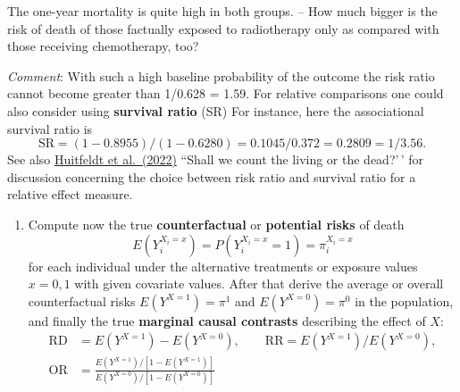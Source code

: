 \documentclass[
]{book}
\newenvironment{Shaded}{\begin{snugshade}}{\end{snugshade}}
\newcommand{\AttributeTok}[1]{\textcolor[rgb]{0.13,0.29,0.53}{#1}}
\newcommand{\DecValTok}[1]{\textcolor[rgb]{0.00,0.00,0.81}{#1}}
\newcommand{\FunctionTok}[1]{\textcolor[rgb]{0.13,0.29,0.53}{\textbf{#1}}}
\newcommand{\NormalTok}[1]{#1}
\newcommand{\OtherTok}[1]{\textcolor[rgb]{0.56,0.35,0.01}{#1}}
\newcommand{\SpecialCharTok}[1]{\textcolor[rgb]{0.81,0.36,0.00}{\textbf{#1}}}
\providecommand{\tightlist}{%
  \setlength{\itemsep}{0pt}\setlength{\parskip}{0pt}}
\begin{document}
The one-year mortality is quite high in both groups. -- How much bigger
is the risk of death of those factually exposed to radiotherapy only as
compared with those receiving chemotherapy, too?

\emph{Comment}: With such a high baseline probability of the outcome the risk
ratio cannot become greater than 1/0.628 = 1.59. For relative
comparisons one could also consider using \textbf{survival ratio} (SR) For
instance, here the associational survival ratio is
\[ \text{SR} = (1-0.8955)/(1-0.6280) = 0.1045/0.372 = 0.2809 = 1/3.56 . \]
See also \href{https://doi.org/10.48550/arXiv.2106.06316}{Huitfeldt et al.~(2022)}
``Shall we count the living or the dead?'\,'
for discussion concerning the choice between risk ratio and survival
ratio for a relative effect measure.

\begin{enumerate}
\def\labelenumi{\arabic{enumi}.}
\setcounter{enumi}{1}
\tightlist
\item
  Compute now the true \textbf{counterfactual} or \textbf{potential risks} of
  death \[ E(Y_i^{X_i=x}) = P(Y_i^{X_i=x}=1) = \pi_i^{X_i=x} \] for
  each individual under the alternative treatments or exposure values
  \(x=0,1\) with given covariate values. After that derive the average
  or overall counterfactual risks \(E(Y^{X=1}) = \pi^1\) and
  \(E(Y^{X=0}) = \pi^0\) in the population, and finally the true
  \textbf{marginal causal contrasts} describing the effect of \(X\):
  \[\begin{aligned}
   \text{RD} & = E(Y^{X=1})-E(Y^{X=0}), \qquad  
   \text{RR} = E(Y^{X=1})/E(Y^{X=0}), \\
   \text{OR} & = 
   \frac{E(Y^{X=1})/[1 -  E(Y^{X=1})]}{E(Y^{X=0})/[1 -  E(Y^{X=0})] }
  \end{aligned} \]
\end{enumerate}

\begin{Shaded}
\end{Shaded}
\end{document}

